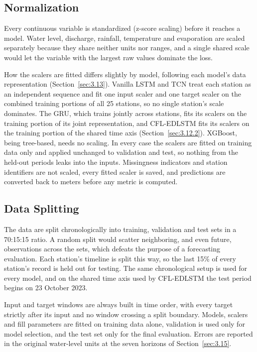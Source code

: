 \subsection{Normalization}
\label{sec:3.9.4}

Every continuous variable is standardized (z-score scaling) before it reaches a
model. Water level, discharge, rainfall, temperature and evaporation are scaled
separately because they share neither units nor ranges, and a single shared
scale would let the variable with the largest raw values dominate the loss.

How the scalers are fitted differs slightly by model, following each model's
data representation (Section~\ref{sec:3.13}). Vanilla LSTM and TCN treat each
station as an independent sequence and fit one input scaler and one target
scaler on the combined training portions of all 25 stations, so no single
station's scale dominates. The GRU, which trains jointly across stations, fits
its scalers on the training portion of its joint representation, and CFL-EDLSTM
fits its scalers on the training portion of the shared time axis
(Section~\ref{sec:3.12.2}). XGBoost, being tree-based, needs no scaling. In
every case the scalers are fitted on training data only and applied unchanged to
validation and test, so nothing from the held-out periods leaks into the inputs.
Missingness indicators and station identifiers are not scaled, every fitted
scaler is saved, and predictions are converted back to meters before any metric
is computed.

\subsection{Data Splitting}
\label{sec:3.9.5}

The data are split chronologically into training, validation and test sets in a
70:15:15 ratio. A random split would scatter neighboring, and even future,
observations across the sets, which defeats the purpose of a forecasting
evaluation. Each station's timeline is split this way, so the last 15\% of every
station's record is held out for testing. The same chronological setup is used
for every model, and on the shared time axis used by CFL-EDLSTM the test period
begins on 23 October 2023.

Input and target windows are always built in time order, with every target
strictly after its input and no window crossing a split boundary. Models,
scalers and fill parameters are fitted on training data alone, validation is
used only for model selection, and the test set only for the final evaluation.
Errors are reported in the original water-level units at the seven horizons of
Section~\ref{sec:3.15}.

